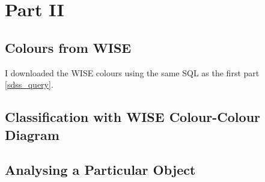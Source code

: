 \documentclass[letterpaper, oneside]{article}
\begin{document}

\section{Part II}

\subsection{Colours from WISE}

I downloaded the WISE colours using the same SQL as the first part \ref{sdss_query}.

\subsection{Classification with WISE Colour-Colour Diagram}



\subsection{Analysing a Particular Object}






\end{document}
